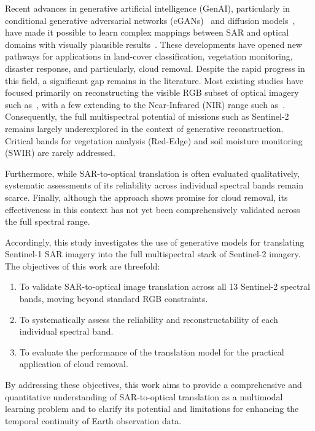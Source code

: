 \documentclass[remotesensing,article,submit,pdftex,moreauthors]{Definitions/mdpi}
\begin{document}
Recent advances in generative artificial intelligence (GenAI), particularly in conditional generative adversarial networks (cGANs)~\cite{cGANs_mirza} and diffusion models~\cite{DDPM_2020}, have made it possible to learn complex mappings between SAR and optical domains with visually plausible results~\cite{cr_fuse_HR_GEN}. These developments have opened new pathways for applications in land-cover classification, vegetation monitoring, disaster response, and particularly, cloud removal. Despite the rapid progress in this field, a significant gap remains in the literature. Most existing studies have focused primarily on reconstructing the visible RGB subset of optical imagery such as~\cite{CR_RS_GAN_s2o, cr_fuse_HR_GEN, c_diffusion_s2o, hvt_cgan, s2o_color_super_diff}, with a few extending to the Near-Infrared (NIR) range such as~\cite{filmy_cloudy_NIR_Enomoto, Mult_temp_S12_fus}. Consequently, the full multispectral potential of missions such as Sentinel-2 remains largely underexplored in the context of generative reconstruction. Critical bands for vegetation analysis (Red-Edge) and soil moisture monitoring (SWIR) are rarely addressed. 

Furthermore, while SAR-to-optical translation is often evaluated qualitatively, systematic assessments of its reliability across individual spectral bands remain scarce. Finally, although the approach shows promise for cloud removal, its effectiveness in this context has not yet been comprehensively validated across the full spectral range.

Accordingly, this study investigates the use of generative models for translating Sentinel-1 SAR imagery into the full multispectral stack of Sentinel-2 imagery. The objectives of this work are threefold:
\begin{enumerate}
    \item  To validate SAR-to-optical image translation across all 13 Sentinel-2 spectral bands, moving beyond standard RGB constraints.
    \item To systematically assess the reliability and reconstructability of each individual spectral band.
    \item  To evaluate the performance of the translation model for the practical application of cloud removal.
\end{enumerate}
By addressing these objectives, this work aims to provide a comprehensive and quantitative understanding of SAR-to-optical translation as a multimodal learning problem and to clarify its potential and limitations for enhancing the temporal continuity of Earth observation data.
\end{document}
